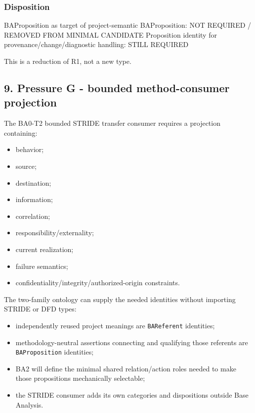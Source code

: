 \documentclass[
  10pt,
]{article}
\newenvironment{Shaded}{}{}
\newcommand{\NormalTok}[1]{#1}
\providecommand{\tightlist}{%
  \setlength{\itemsep}{0pt}\setlength{\parskip}{0pt}}
\begin{document}
\subsubsection{Disposition}\label{disposition-5}

\begin{Shaded}
\begin{Highlighting}[]
\NormalTok{BAProposition as target of project{-}semantic BAProposition: NOT REQUIRED / REMOVED FROM MINIMAL CANDIDATE}
\NormalTok{Proposition identity for provenance/change/diagnostic handling: STILL REQUIRED}
\end{Highlighting}
\end{Shaded}

This is a reduction of R1, not a new type.

\subsection{9. Pressure G - bounded method-consumer
projection}\label{pressure-g---bounded-method-consumer-projection}

The BA0-T2 bounded STRIDE transfer consumer requires a projection
containing:

\begin{itemize}
\tightlist
\item
  behavior;
\item
  source;
\item
  destination;
\item
  information;
\item
  correlation;
\item
  responsibility/externality;
\item
  current realization;
\item
  failure semantics;
\item
  confidentiality/integrity/authorized-origin constraints.
\end{itemize}

The two-family ontology can supply the needed identities without
importing STRIDE or DFD types:

\begin{itemize}
\tightlist
\item
  independently reused project meanings are \texttt{BAReferent}
  identities;
\item
  methodology-neutral assertions connecting and qualifying those
  referents are \texttt{BAProposition} identities;
\item
  BA2 will define the minimal shared relation/action roles needed to
  make those propositions mechanically selectable;
\item
  the STRIDE consumer adds its own categories and dispositions outside
  Base Analysis.
\end{itemize}
\end{document}

